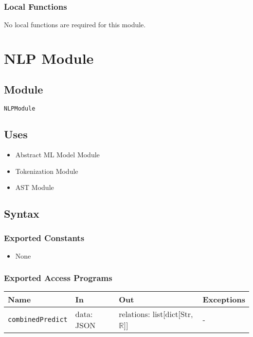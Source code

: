\documentclass[12pt, titlepage]{article}
\begin{document}
\begin{itemize}
\subsubsection{Local Functions}
No local functions are required for this module.


\section{NLP Module}  \label{NLPModule} %

\subsection{Module}

\texttt{NLPModule}

\subsection{Uses}

\begin{itemize}
    \item Abstract ML Model Module
    \item Tokenization Module
    \item AST Module
\end{itemize}

\subsection{Syntax}

\subsubsection{Exported Constants}

\begin{itemize}
    \item None
\end{itemize}

\subsubsection{Exported Access Programs}

\begin{center}
\begin{tabular}{p{5cm} p{3.5cm} p{3.5cm} p{2cm}}
\hline
\textbf{Name} & \textbf{In} & \textbf{Out} & \textbf{Exceptions} \\ 
\hline
\texttt{combinedPredict} & data: JSON & relations: list[dict[Str, $\mathbb{R}$]] & -\\
\hline
\end{tabular}
\end{center}


\end{itemize}
\end{document}
